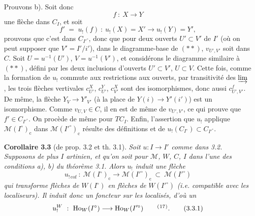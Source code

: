 \documentclass[11pt]{article}
\newcommand{\printedpage}[1]{\marginpar{\footnotesize p.~#1\ifstrequal{#1}{1}{\\[2pt]{[page 1]}}{}}}
\newcommand{\msp}[1]{\ifstrequal{#1}{page 1}{}{\marginpar{\footnotesize [#1]}}}
\begin{document}
Prouvons b). Soit donc
\[
f\ :\ X\longrightarrow Y
\]
une flèche dans $C_I$, et soit
\[
f' \;=\; u_!(f)\ :\ u_!(X)=X' \longrightarrow u_!(Y)=Y',
\]
prouvons que c'est dans $C_{I'^\circ}$, donc que
\msp{54}
pour deux ouverts $U'\subset V'$ de $I'$ (où on peut supposer que $V'=I'/i'$), dans le diagramme-base de $(**)$, $v_{U',V'}$ soit dans $C$. Soit $U=u^{-1}(U')$, $V=u^{-1}(V')$, et considérons le %
diagramme similaire à $(**)$, défini par les deux inclusions d'ouverts $U'\subset V'$, $U\subset V$. Cette fois, comme la formation de $u_!$ commute aux restrictions aux ouverts, par transitivité des $\varinjlim$ , les trois flèches vertivales $c^X_{U'}$, $c^Y_{U'}$, $c^X_{V'}$ sont des isomorphismes, donc aussi $c^f_{U',V'}$. De %
même, la flèche $Y_V\longrightarrow Y'_{V'}$ (à la place de $Y(i)\longrightarrow Y'(i')$) est un isomorphisme. Comme $v_{U,V}\in C$, il en est de même de $v_{U',V'}$, ce qui prouve que $f'\in C_{I'^\circ}$. On procède de même pour $TC_I$. Enfin, l'assertion que $u_!$ applique $\mathcal{M}(I^\circ)_{\mathrm{c}}$ dans $\mathcal{M}(I'^\circ)_{\mathrm{c}}$ résulte des définitions et de $u_!(C_{I^\circ})\subset C_{I'^\circ}$.

\textbf{Corollaire 3.3} (de prop. 3.2 et th. 3.1). \textit{Soit $u:I\longrightarrow I'$ comme dans \textup{3.2}. Supposons de plus $I$ artinien, et}
\printedpage{28}
\msp{55}
\textit{qu'on soit pour $\mathcal{M}$, $W$, $C$, $I$ dans l'une des conditions \textup{a), b)} du théorème \textup{3.1}. Alors $u_!$ induit une flèche}
\[
u_{!\,\mathrm{cof}}\ :\ \mathcal{M}(I^\circ)_{\mathrm{c}} \longrightarrow \mathcal{M}(I'^\circ)_{\mathrm{c}}\ \subset\ \mathcal{M}(I'^\circ)
\]
\textit{qui transforme flèches de $W(I^\circ)$ en flèches de $W(I'^\circ)$ (i.e. compatible avec les localiseurs). Il induit donc un foncteur sur les localisés, d'où un}
\[
u_!^W\ :\ \mathrm{Ho}_W(I^\circ) \longrightarrow \mathrm{Ho}_W(I'^\circ) \qquad \mbox{\textsuperscript{(}\footnotemark[17]\textsuperscript{)}}.
\tag*{(3.3.1)}
\]
\end{document}
